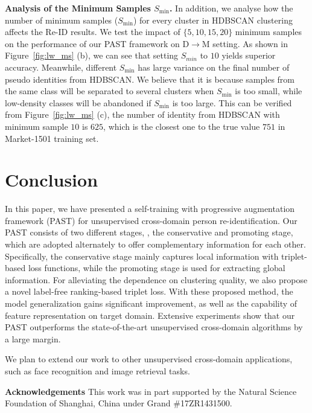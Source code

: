 \documentclass[10pt,twocolumn,letterpaper]{article}
\begin{document}
\textbf{Analysis of the Minimum Samples $S_{\min}$.}
In addition, we analyse how the number of minimum samples ($S_{\min}$) for every cluster in HDBSCAN clustering affects the Re-ID results. 
We test the impact of $\lbrace 5, 10, 15, 20\rbrace$ minimum samples on the performance of our PAST framework on D$\rightarrow$M setting. 
As shown in Figure~\ref{fig:lw_ms} (b), we can see that setting $S_{min}$ to $10$ yields superior accuracy. 
Meanwhile, different $S_{\min}$ has large variance on the final number of pseudo identities from HDBSCAN. We believe that it is because samples from the same class will be separated to several clusters when $S_{\min}$ is too small, while low-density classes will be abandoned if $S_{\min}$ is too large. 
This can be verified from Figure~\ref{fig:lw_ms} (c), the number of identity from HDBSCAN with minimum sample $10$ is \textbf{$625$}, which is the closest one to the true value $751$ in Market-1501 training set.


\section{Conclusion}
In this paper, we have presented a self-training with progressive augmentation framework (PAST) for unsupervised cross-domain person re-identification. Our PAST consists of two different stages, \ie, the conservative and promoting stage, which are adopted alternately to offer complementary information for each other. 
Specifically, the conservative stage mainly captures local information with triplet-based loss functions, while the promoting stage is used for extracting global information. 
For alleviating the dependence on clustering quality, we also propose a novel label-free ranking-based triplet loss. 
With these proposed method, the model generalization gains significant improvement, as well as the capability of feature representation on target domain. 
Extensive experiments show that our PAST outperforms the state-of-the-art unsupervised cross-domain algorithms by a large margin.

We plan to extend our work to other unsupervised cross-domain applications, such as face recognition 
and image retrieval tasks.


\textbf{Acknowledgements}
This work was in part supported by the Natural Science Foundation of Shanghai, China under Grand \#17ZR1431500.







{\small


}
\end{document}
